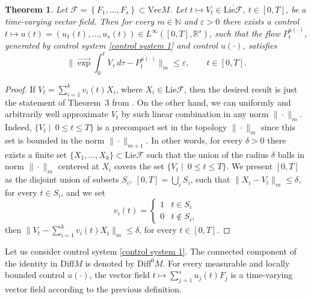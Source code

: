 \documentclass[10pt]{article}
\newcommand{\e}{\varepsilon}
\newcommand{\R}{{\mathbb R}}
\newcommand{\N}{{\mathbb N}}
\newcommand{\E}
{\overrightarrow{\exp}\int}
\newtheorem{theorem}{Theorem}
\begin{document}
\begin{theorem} \label{theorem : motion planning diffeo}
Let $\mathcal F=\left\{F_1,\dots,F_s\right\}\subset\mathrm{Vec}M$. Let $t\mapsto V_t\in\overline{\mathrm{Lie}\mathcal F},\ t\in[0,T]$, be a time-varying vector field. Then for every $m\in \N$ and $\e>0$ there exists a control $t \mapsto u(t)=(u_1(t),\dots,u_s(t)) \in L^\infty([0,T],\R^s)$, such that the flow $P^{u(\cdot)}_t$, generated by control system \eqref{control system 1} and control $u(\cdot)$, satisfies
\begin{equation*}
    \|\E_0^tV_\tau\,d\tau- P^{u(\cdot)}_t \|_m \le\e,\qquad t\in[0,T].
\end{equation*}
\end{theorem}
\begin{proof}
    If $V_t=\sum\limits_{i=1}^kv_i(t)X_i$, where $X_i\in\mathrm{Lie}\mathcal F$, then the desired result is just the
statement of Theorem~3 from \cite{AgSa20}. On the other hand, we can uniformly and arbitrarily well approximate $V_t$  by such linear combination in
any norm $\|\cdot\|_m$. Indeed, $\{V_t\mid \ 0\le t\le T\}$ is a precompact set in the topology $\|\cdot\|_m$ since this set is bounded in the norm     
$\|\cdot\|_{m+1}$. In other words, for every $\delta>0$ there exists a finite set $\{X_1,\dots,X_k\}\subset \mathrm{Lie}\mathcal F$ such that 
the union of the radius $\delta$ balls in norm $\|\cdot\|_m$ centered at $X_i$ covers the set $\{V_t \mid \ 0\le t\le T\}$. We present 
$[0,T]$ as the disjoint union of subsets $S_i,\ [0,T]=\bigcup\limits_iS_i$, such that $\|X_i-V_t\|_m\le\delta$, for every $t\in S_i$, and we set
\begin{equation*}
    v_i(t)=\begin{cases}1& t\in S_i\\ 0& t\notin S_i, \end{cases}
\end{equation*}   
then $\|V_t-\sum\limits_{i=1}^kv_i(t)X_i\|_m\le\delta$, for every $t\in[0,T]$.
\end{proof}  

Let us consider control system \eqref{control system 1}. The connected component of the identity in $\mathrm{Diff} M$ is denoted by $\mathrm{Diff}^0 M$. For every measurable and locally bounded control $u(\cdot)$, the vector field $t \mapsto \sum_{j=1}^su_j(t)F_j$ is a time-varying vector field according to the previous definition.
\end{document}

